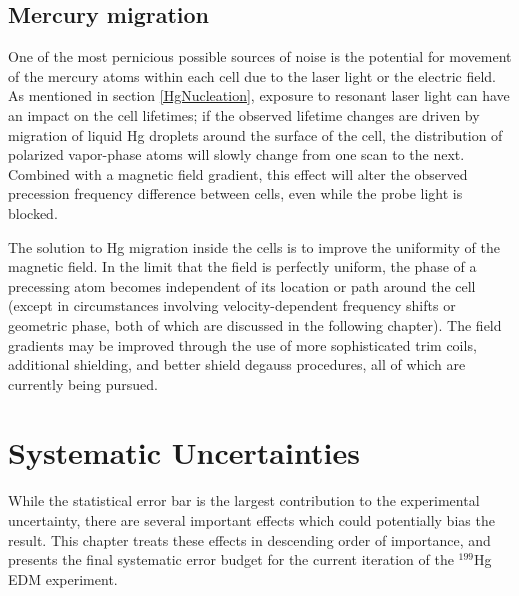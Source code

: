 \documentclass [10pt, twoside] {uwthesis}[2012/04/02]
\begin{document}
\section{Mercury migration} %
One of the most pernicious possible sources of noise is the potential for movement of the mercury atoms within each cell due to the laser light or the electric field. As mentioned in section \ref{HgNucleation}, exposure to resonant laser light can have an impact on the cell lifetimes; if the observed lifetime changes are driven by migration of liquid Hg droplets around the surface of the cell, the distribution of polarized vapor-phase atoms will slowly change from one scan to the next. Combined with a magnetic field gradient, this effect will alter the observed precession frequency difference between cells, even while the probe light is blocked. 

The solution to Hg migration inside the cells is to improve the uniformity of the magnetic field. In the limit that the field is perfectly uniform, the phase of a precessing atom becomes independent of its location or path around the cell (except in circumstances involving velocity-dependent frequency shifts or geometric phase, both of which are discussed in the following chapter). The field gradients may be improved through the use of more sophisticated trim coils, additional shielding, and better shield degauss procedures, all of which are currently being pursued.

\chapter{Systematic Uncertainties}
\label{SystematicChapter}
While the statistical error bar is the largest contribution to the experimental uncertainty, there are several important effects which could potentially bias the result. This chapter treats these effects in descending order of importance, and presents the final systematic error budget for the current iteration of the $^{199}$Hg EDM experiment.
\end{document}

